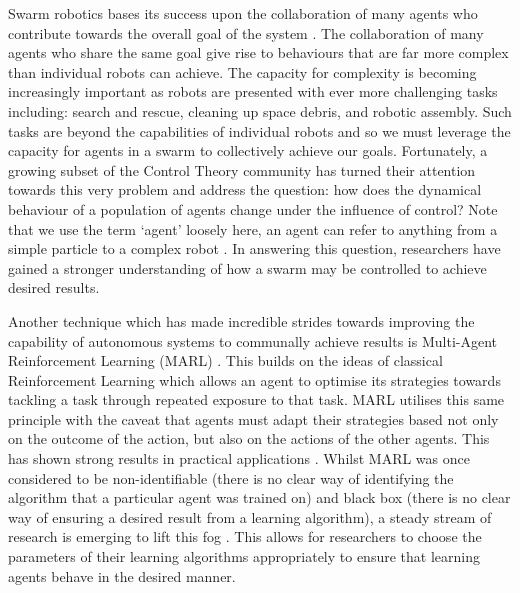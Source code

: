 \documentclass[.../main.tex]{subfiles}
\begin{document}

    Swarm robotics bases its success upon the collaboration of many
    agents who contribute towards the overall goal of the system
    \cite{Hamann2018}. The collaboration of many agents who share the
    same goal give rise to behaviours that are far more complex
    than individual robots can achieve. The capacity for complexity is
    becoming increasingly important as robots are presented
    with ever more challenging tasks including: search and rescue,
    cleaning up space debris, and robotic assembly. Such tasks are
    beyond the capabilities of individual robots and so we must
    leverage the capacity for agents in a swarm to collectively
    achieve our goals. Fortunately, a growing subset of the Control
    Theory community has turned their attention towards this very
    problem and address the question: how does the dynamical behaviour
    of a population of agents change under the influence of control?
    Note that we use the term `agent' loosely here, an agent can refer
    to anything from a simple particle \cite{Roy2017} to a complex
    robot \cite{Elamvazhuthi2019}. In answering this question,
    researchers have gained a stronger understanding of how a swarm
    may be controlled to achieve desired results.

    Another technique which has made incredible strides towards
    improving the capability of autonomous systems to communally
    achieve results is Multi-Agent Reinforcement Learning (MARL)
    \cite{SchwartzMulti-agentApproach}. This builds on the ideas of
    classical Reinforcement Learning which allows an agent to optimise
    its strategies towards tackling a task through repeated exposure
    to that task.  MARL utilises this same principle with the caveat
    that agents must adapt their strategies based not only on the
    outcome of the action, but also on the actions of the other
    agents. This has shown strong results in practical applications
    \cite{Woolridge2009, SchwartzMulti-agentApproach,
      Yang2004}. Whilst MARL was once considered to be
    non-identifiable (there is no clear way of identifying the
    algorithm that a particular agent was trained on) and black box
    (there is no clear way of ensuring a desired result from a
    learning algorithm), a steady stream of research is emerging to
    lift this fog \cite{Bloembergen2015}. This allows for researchers
    to choose the parameters of their learning algorithms
    appropriately to ensure that learning agents behave in the desired
    manner.
\end{document}
